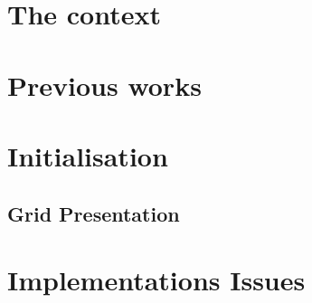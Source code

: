 \documentclass[12pt]{report}
\begin{document}


% 


\begin{abstract}

\end{abstract}

\tableofcontents
\listoffigures






\chapter{The context}

\chapter{Previous works}

%

\chapter{Initialisation}

\section{Grid Presentation}






\chapter{Implementations Issues}

\end{document}

